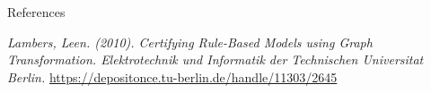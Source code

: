 \documentclass[xcolor=dvipsnames,pdf,10pt]{beamer}
\begin{document}
\begin{frame}{References}
\begin{thebibliography}{XX}
 {\emph{Lambers, Leen. (2010). Certifying Rule-Based Models using Graph Transformation. Elektrotechnik und Informatik der Technischen Universitat Berlin.} \url{https://depositonce.tu-berlin.de/handle/11303/2645}}
\end{thebibliography}
\end{frame}



\titlepageINF
\end{document}
